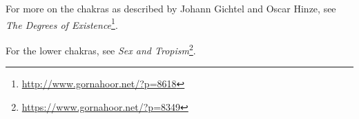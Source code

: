 For more on the chakras as described by Johann Gichtel and Oscar Hinze, see \textit{The Degrees of Existence}\footnote{\url{http://www.gornahoor.net/?p=8618}}.

For the lower chakras, see \textit{Sex and Tropism}\footnote{\url{https://www.gornahoor.net/?p=8349}}.



